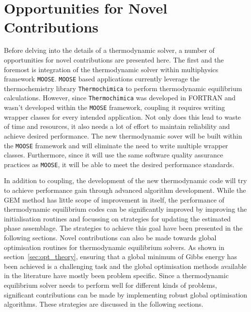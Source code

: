 \section{Opportunities for Novel Contributions}
Before delving into the details of a thermodynamic solver, a number of opportunities for novel contributions are presented here. The first and the foremost is integration of the thermodynamic solver within multiphysics framework \texttt{MOOSE}. \texttt{MOOSE} based applications currently leverage the thermochemistry library \texttt{Thermochimica} to perform thermodynamic equilibrium calculations. However, since \texttt{Thermochimica} was developed in FORTRAN and wasn't developed within the \texttt{MOOSE} framework, coupling it requires writing wrapper classes for every intended application. Not only does this lead to waste of time and resources, it also needs a lot of effort to maintain reliability and achieve desired performance. The new thermodynamic sover will be built within the \texttt{MOOSE} framework and will eliminate the need to write multiple wrapper classes. Furthermore, since it will use the same software quality assurance practices as \texttt{MOOSE}, it will be able to meet the desired performance standards.

	In addition to coupling, the development of the new thermodynamic code will try to achieve performance gain through advanced algorithm development. While the GEM method has little scope of improvement in itself, the performance of thermodynamic equilibrium codes can be significantly improved by improving the initialisation routines and focussing on strategies for updating the estimated phase assemblage. The strategies to achieve this goal have been presented in the following sections. Novel contributions can also be made towards global optimisation routines for thermodynamic equilibrium solvers. As shown in section~\ref{sec:opt_theory}, ensuring that a global minimum of Gibbs energy has been achieved is a challenging task and the global optimisation methods available in the literature have mostly been problem specific. Since a thermodynamic equilibrium solver needs to perform well for different kinds of problems, significant contributions can be made by implementing robust global optimisation algorithms. These strategies are discussed in the following sections.


